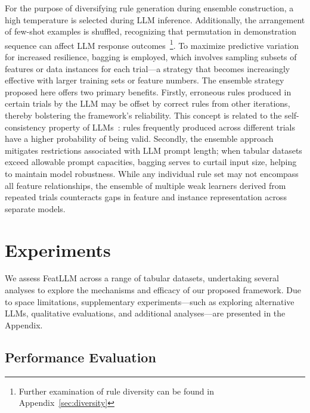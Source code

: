 For the purpose of diversifying rule generation during ensemble construction, a high temperature is selected during LLM inference. Additionally, the arrangement of few-shot examples is shuffled, recognizing that permutation in demonstration sequence can affect LLM response outcomes~\cite{lu2022fantastically}\footnote{Further examination of rule diversity can be found in Appendix~\ref{sec:diversity}}. To maximize predictive variation for increased resilience, bagging is employed, which involves sampling subsets of features or data instances for each trial—a strategy that becomes increasingly effective with larger training sets or feature numbers. The ensemble strategy proposed here offers two primary benefits. Firstly, erroneous rules produced in certain trials by the LLM may be offset by correct rules from other iterations, thereby bolstering the framework's reliability. This concept is related to the self-consistency property of LLMs~\cite{wang2022self}: rules frequently produced across different trials have a higher probability of being valid. Secondly, the ensemble approach mitigates restrictions associated with LLM prompt length; when tabular datasets exceed allowable prompt capacities, bagging serves to curtail input size, helping to maintain model robustness. While any individual rule set may not encompass all feature relationships, the ensemble of multiple weak learners derived from repeated trials counteracts gaps in feature and instance representation across separate models.

\section{Experiments}
We assess \textsf{FeatLLM} across a range of tabular datasets, undertaking several analyses to explore the mechanisms and efficacy of our proposed framework. Due to space limitations, supplementary experiments—such as exploring alternative LLMs, qualitative evaluations, and additional analyses—are presented in the Appendix.

\subsection{Performance Evaluation}
